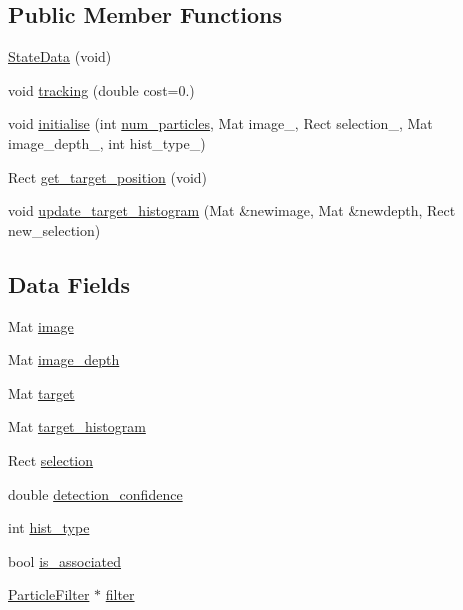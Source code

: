 \subsection*{Public Member Functions}
\begin{DoxyCompactItemize}
\item 
\hyperlink{classStateData_a3bbfa4301403ebf5d24d5d16cf246b88}{State\-Data} (void)
\item 
void \hyperlink{classStateData_af4bbe24b619137cba16b7b85970e1bd7}{tracking} (double cost=0.)
\item 
void \hyperlink{classStateData_a3fe497a97247af50f8eb876d6284da69}{initialise} (int \hyperlink{social__robot_8cpp_acf574bc864f7f0fc111320f1d6c449d5}{num\-\_\-particles}, Mat image\-\_\-, Rect selection\-\_\-, Mat image\-\_\-depth\-\_\-, int hist\-\_\-type\-\_\-)
\item 
Rect \hyperlink{classStateData_aa2c20a09eecd353d4454e707ac17f143}{get\-\_\-target\-\_\-position} (void)
\item 
void \hyperlink{classStateData_a2b26ea86bd2d1d3d37debec000fefa01}{update\-\_\-target\-\_\-histogram} (Mat \&newimage, Mat \&newdepth, Rect new\-\_\-selection)
\end{DoxyCompactItemize}
\subsection*{Data Fields}
\begin{DoxyCompactItemize}
\item 
Mat \hyperlink{classStateData_ab1a1e2be2b9a55c78bc579024d30cf64}{image}
\item 
Mat \hyperlink{classStateData_a662c82a423f855845f2be8700af72817}{image\-\_\-depth}
\item 
Mat \hyperlink{classStateData_ac778c44e62237a225361a80894a48ee8}{target}
\item 
Mat \hyperlink{classStateData_af93e02e6025c07b7a383b2e755f52dca}{target\-\_\-histogram}
\item 
Rect \hyperlink{classStateData_afea0bc5d1743e2db008238bfe9f574ce}{selection}
\item 
double \hyperlink{classStateData_abe87d63070a9fc98cd9f1475495725e6}{detection\-\_\-confidence}
\item 
int \hyperlink{classStateData_a14b4b6d403b4517d7102f49a501d51ed}{hist\-\_\-type}
\item 
bool \hyperlink{classStateData_ad5f3d2a522bfdcff47e7d028bf19f012}{is\-\_\-associated}
\item 
\hyperlink{classParticleFilter}{Particle\-Filter} $\ast$ \hyperlink{classStateData_a42c35fd351a6634b67fd1fd2f5a09cf4}{filter}
\end{DoxyCompactItemize}


